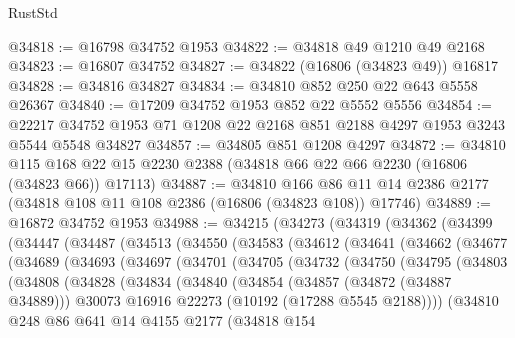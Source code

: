 \begin{lexlean}{RustStd}
\begin{coremodule}
@34818 := @16798 @34752 @1953
@34822 := @34818 @49 @1210 @49 @2168
@34823 := @16807 @34752
@34827 := @34822 (@16806 (@34823 @49)) @16817
@34828 := @34816 @34827
@34834 := @34810 @852 @250 @22 @643 @5558 @26367
@34840 := @17209 @34752 @1953 @852 @22 @5552 @5556
@34854 := @22217 @34752 @1953 @71 @1208 @22 @2168 @851 @2188 @4297 @1953 @3243 @5544 @5548 @34827
@34857 := @34805 @851 @1208 @4297
@34872 := @34810
    @115
    @168
    @22
    @15
    @2230
    @2388
    (@34818 @66 @22 @66 @2230 (@16806 (@34823 @66)) @17113)
@34887 := @34810
    @166
    @86
    @11
    @14
    @2386
    @2177
    (@34818 @108 @11 @108 @2386 (@16806 (@34823 @108)) @17746)
@34889 := @16872 @34752 @1953
@34988 := @34215
    (@34273
      (@34319
        (@34362
          (@34399
            (@34447
              (@34487
                (@34513
                  (@34550
                    (@34583
                      (@34612
                        (@34641
                          (@34662
                            (@34677
                              (@34689
                                (@34693
                                  (@34697
                                    (@34701
                                      (@34705
                                        (@34732
                                          (@34750
                                            (@34795
                                              (@34803
                                                (@34808
                                                  (@34828
                                                    (@34834
                                                      (@34840
                                                        (@34854
                                                          (@34857 (@34872 (@34887 @34889)))
                                                          @30073
                                                          @16916
                                                          @22273
                                                          (@10192 (@17288 @5545 @2188))))
                                                      (@34810
                                                        @248
                                                        @86
                                                        @641
                                                        @14
                                                        @4155
                                                        @2177
                                                        (@34818
                                                          @154

\end{coremodule}
\end{lexlean}
